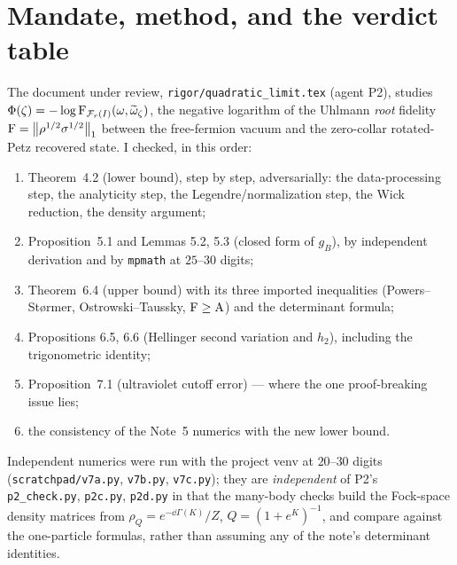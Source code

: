 \documentclass[11pt]{article}
\newcommand{\norm}[1]{\left\lVert #1\right\rVert}
\newcommand{\Hell}{\operatorname{A}}
\theoremstyle{definition}\newtheorem{problem}[theorem]{Problem}
\begin{document}
\tableofcontents

\section{Mandate, method, and the verdict table}\label{sec:mandate}

The document under review, \texttt{rigor/quadratic\_limit.tex} (agent P2), studies
\(\Phi(\zeta)=-\log\operatorname{F}_{\mathcal F_r(I)}(\omega,\widetilde\omega_\zeta)\), the negative logarithm of the
Uhlmann \emph{root} fidelity \(\Fid=\norm{\rho^{1/2}\sigma^{1/2}}_1\) between the free-fermion
vacuum and the zero-collar rotated-Petz recovered state.  I checked, in this order:

\begin{enumerate}[label=(\alph*),leftmargin=2em]
\item Theorem~4.2 (lower bound), step by step, adversarially: the data-processing step, the
 analyticity step, the Legendre/normalization step, the Wick reduction, the density argument;
\item Proposition~5.1 and Lemmas 5.2, 5.3 (closed form of \(g_B\)), by independent derivation and by
 \texttt{mpmath} at \(25\)--\(30\) digits;
\item Theorem~6.4 (upper bound) with its three imported inequalities (Powers--St\o rmer,
 Ostrowski--Taussky, \(\Fid\ge\Hell\)) and the determinant formula;
\item Propositions 6.5, 6.6 (Hellinger second variation and \(h_2\)), including the trigonometric
 identity;
\item Proposition~7.1 (ultraviolet cutoff error) --- where the one proof-breaking issue lies;
\item the consistency of the Note~5 numerics with the new lower bound.
\end{enumerate}

Independent numerics were run with the project venv at \(20\)--\(30\) digits
(\texttt{scratchpad/v7a.py}, \texttt{v7b.py}, \texttt{v7c.py}); they are \emph{independent} of P2's
\texttt{p2\_check.py}, \texttt{p2c.py}, \texttt{p2d.py} in that the many-body checks build the
Fock-space density matrices from \(\rho_Q=e^{-\dd\Gamma(K)}/Z\), \(Q=(1+e^K)^{-1}\), and compare
against the one-particle formulas, rather than assuming any of the note's determinant identities.
\end{document}
